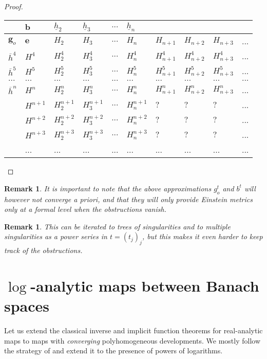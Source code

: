 \documentclass[12pt]{article}
\newtheorem{rem}[thm]{Remark}
\begin{document}
\begin{proof}
    \begin{tabular}{l|lllllllll}
    &$\mathbf{b}$ & $\underline{h}_2$ &  $\underline{h}_3$ & $...$ & $\underline{h}_n$ & & & & \\
    \hline
    $\mathbf{g}_o$ & $\mathbf{e}$ & $H_2$ &$H_3$ & $...$ &$H_n$&$H_{n+1}$&$H_{n+2}$ & $H_{n+3}$& ...\\
    $\overline{h}^4$ & $H^4$&$H^4_2$&$H^4_3$ &$...$&$H_n^4$ & $H_{n+1}^4$ &$H_{n+2}^{4}$&$H_{n+3}^{4}$ &...\\
     $\overline{h}^{5}$ & $H^5$&$H^5_2$&$H^5_3$ & $...$& $H_n^5$ &  $H_{n+1}^5$ & $H_{n+2}^5$ &$H_{n+3}^{5}$& ...\\
     $...$ & $...$& $...$& $...$ & $...$& $...$ &  $...$ & $...$& $...$& $...$\\
     $\overline{h}^{n}$ &  $H^n$& $H^n_2$& $H^n_3$ & $...$& $H_n^n$ &  $H^n_{n+1}$ & $H^n_{n+2}$ &$H^n_{n+3}$&  ...\\
      &  $H^{n+1}$& $H^{n+1}_2$& $H^{n+1}_3$ & $...$& $H^{n+1}_n$ &  $?$ & $?$& $?$&...\\
      &  $H^{n+2}$& $H^{n+2}_2$& $H^{n+2}_3$ & $...$& $H^{n+2}_n$ &  $?$ & $?$& $?$&...\\
     & $H^{n+3}$& $H^{n+3}_2$& $H^{n+3}_3$ & $...$& $H^{n+3}_n$ &  $?$ & $?$& $?$&...\\
     & ...& ...& ...& ...& ...& ...& ...& ...& ...
    \end{tabular}
    \end{proof}
    \begin{rem}
    It is important to note that the above approximations $g_{o}^t$ and $b^t$ will however not converge a priori, and that they will only provide Einstein metrics only at a formal level when the obstructions vanish.
    \end{rem}
    \begin{rem}
    This can be iterated to trees of singularities and to multiple singularities as a power series in $t= (t_j)_j$, but this makes it even harder to keep track of the obstructions.
    \end{rem}
    
    
  \section{$\log$-analytic maps between Banach spaces}
  
    Let us extend the classical inverse and implicit function theorems for real-analytic maps to maps with \emph{converging} polyhomogeneous developments. We mostly follow the strategy of \cite{bt} and extend it to the presence of powers of logarithms.
\end{document}
